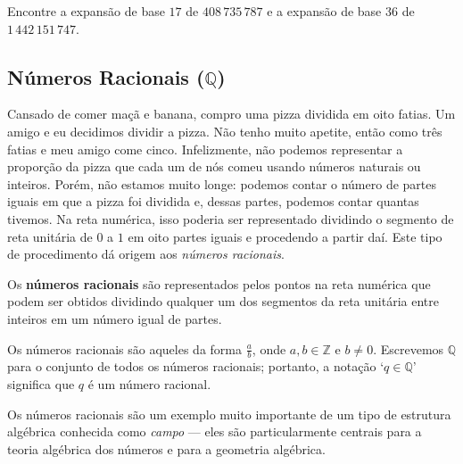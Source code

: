 \begin{exercise}
Encontre a expansão de base $ 17$ de $ 408\,735\,787$ e a expansão de base $36$ de $1\,442\,151\,747$.
\end{exercise}

\subsection*{Números Racionais ($\mathbb{Q}$)}

Cansado de comer maçã e banana, compro uma pizza dividida em oito fatias. Um amigo e eu decidimos dividir a pizza. Não tenho muito apetite, então como três fatias e meu amigo come cinco. Infelizmente, não podemos representar a proporção da pizza que cada um de nós comeu usando números naturais ou inteiros. Porém, não estamos muito longe: podemos contar o número de partes iguais em que a pizza foi dividida e, dessas partes, podemos contar quantas tivemos. Na reta numérica, isso poderia ser representado dividindo o segmento de reta unitária de $0$ a $1$ em oito partes iguais e procedendo a partir daí. Este tipo de procedimento dá origem aos \textit{números racionais}.

\begin{definition}
\label{defRationalsInformal}
Os \textbf{números racionais} são representados pelos pontos na reta numérica que podem ser obtidos dividindo qualquer um dos segmentos da reta unitária entre inteiros em um número igual de partes.
\begin{center}
\end{center}
Os números racionais são aqueles da forma $\frac{a}{b}$, onde $a,b \in \mathbb{Z}$ e $b \ne 0$. Escrevemos $\mathbb{Q}$  para o conjunto de todos os números racionais; portanto, a notação `$q \in \mathbb{Q}$' significa que $q$ é um número racional.\end{definition}

Os números racionais são um exemplo muito importante de um tipo de estrutura algébrica conhecida como \textit{campo} --- eles são particularmente centrais para a teoria algébrica dos números e para a geometria algébrica.

